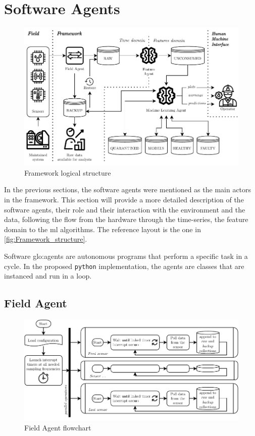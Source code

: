 \section{Software Agents}
\label{sec:agents}

\begin{figure}
    \centering
    \includegraphics[width=\textwidth]{images/Framework/Framework_structure.pdf}
    \caption{Framework logical structure}
    \label{fig:Framework_structure}
\end{figure}

In the previous sections, the software agents were mentioned as the main actors in the framework. This section will provide a more detailed description of the software agents, their role and their interaction with the environment and the data, following the flow from the hardware through the time-series, the feature domain to the \gls{ml} algorithms. The reference layout is the one in \autoref{fig:Framework_structure}. 

Software \gls{glo:agent}s are autonomous programs that perform a specific task in a cycle. In the proposed \texttt{python} implementation, the agents are classes that are instanced and run in a loop.

\subsection{Field Agent}
\label{subsec:FieldAgent}
\begin{figure}
    \centering
    \includegraphics[scale=1]{images/Framework/Field_Agent_flowchart.pdf}
    \caption{Field Agent flowchart}
    \label{fig:Field_Agent_flowchart}
\end{figure}

